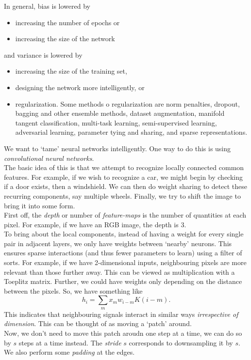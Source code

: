 \documentclass{article}
\begin{document}
		In general, bias is lowered by
		\begin{itemize}
			\item increasing the number of epochs or
			\item increasing the size of the network
		\end{itemize}
		and variance is lowered by
		\begin{itemize}
			\item increasing the size of the training set,
			\item designing the network more intelligently, or
			\item regularization. Some methods o regularization are norm penalties, dropout, bagging and other ensemble methods, dataset augmentation, manifold tangent classification, multi-task learning, semi-supervised learning, adversarial learning, parameter tying and sharing, and sparse representations.
		\end{itemize}
		We want to `tame' neural networks intelligently. One way to do this is using \emph{convolutional neural networks}.\\
		The basic idea of this is that we attempt to recognize locally connected common features. For example, if we wish to recognize a car, we might begin by checking if a door exists, then a windshield. We can then do weight sharing to detect these recurring components, say multiple wheels.  Finally, we try to shift the image to bring it into some form.\\
		First off, the \emph{depth} or number of \emph{feature-maps} is the number of quantities at each pixel. For example, if we have an RGB image, the depth is $3$.\\
		To bring about the local components, instead of having a weight for every single pair in adjacent layers, we only have weights between `nearby' neurons. This ensures sparse interactions (and thus fewer parameters to learn) using a filter of sorts. For example, if we have 2-dimensional inputs, neighbouring pixels are more relevant than those further away. This can be viewed as multiplication with a Toeplitz matrix. Further, we could have weights only depending on the distance between the pixels. So, we have something like
		\[ h_{i} = \sum_m x_m w_{i-m} K(i-m). \]
		This indicates that neighbouring signals interact in similar ways \emph{irrespective of dimension}. This can be thought of as moving a `patch' around.\\
		Now, we don't need to move this patch aroudn one step at a time, we can do so by $s$ steps at a time instead. The \emph{stride} $s$ corresponds to downsampling it by $s$. We also perform some \emph{padding} at the edges.\\
\end{document}
